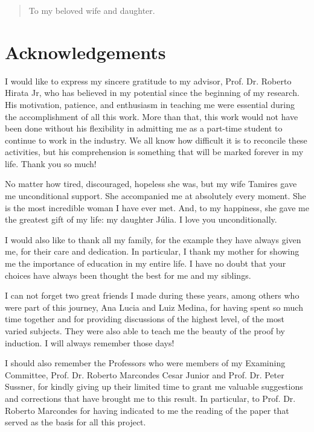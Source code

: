\documentclass[12pt,twoside,a4paper]{book}
\theoremstyle{plain}
\theoremstyle{definition}
\newenvironment{dedication}
     {\vspace{6ex}\begin{quotation}\begin{center}\begin{em}}
     {\par\end{em}\end{center}\end{quotation}}
\begin{document}

\begin{dedication}
To my beloved wife and daughter.
\end{dedication}


\chapter*{Acknowledgements}
I would like to express my sincere gratitude to my advisor, Prof. Dr. Roberto Hirata Jr, who has believed in my potential since the beginning of my research. His motivation, patience, and enthusiasm in teaching me were essential during the accomplishment of all this work. More than that, this work would not have been done without his flexibility in admitting me as a part-time student to continue to work in the industry. We all know how difficult it is to reconcile these activities, but his comprehension is something that will be marked forever in my life. Thank you so much!

No matter how tired, discouraged, hopeless she was, but my wife Tamires gave me unconditional support. She accompanied me at absolutely every moment. She is the most incredible woman I have ever met. And, to my happiness, she gave me the greatest gift of my life: my daughter Júlia. I love you unconditionally.

I would also like to thank all my family, for the example they have always given me, for their care and dedication. In particular, I thank my mother for showing me the importance of education in my entire life. I have no doubt that your choices have always been thought the best for me and my siblings.

I can not forget two great friends I made during these years, among others who were part of this journey, Ana Lucia and Luiz Medina, for having spent so much time together and for providing discussions of the highest level, of the most varied subjects. They were also able to teach me the beauty of the proof by induction. I will always remember those days!

I should also remember the Professors who were members of my Examining Committee, Prof. Dr. Roberto Marcondes Cesar Junior and Prof. Dr. Peter Sussner, for kindly giving up their limited time to grant me valuable suggestions and corrections that have brought me to this result. In particular, to Prof. Dr. Roberto Marcondes for having indicated to me the reading of the paper that served as the basis for all this project.
\end{document}
